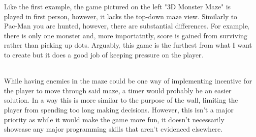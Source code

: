 \documentclass{article}
\begin{document}
\begin{minipage}{0.5\textwidth}\raggedright
Like the first example, the game pictured on the left "3D Monster Maze" is played in first person, however, it lacks the top-down maze view. Similarly to Pac-Man you are hunted, however, there are substantial differences. For example, there is only one monster and, more importatntly, score is gained from surviving rather than picking up dots. Arguably, this game is the furthest from what I want to create but it does a good job of keeping pressure on the player.
\end{minipage}
\linebreak
\\
\linebreak
While having enemies in the maze could be one way of implementing incentive for the player to move through said maze, a timer would probably be an easier solution. In a way this is more similar to the purpose of the wall, limiting the player from spending too long making decisions. However, this isn't a major priority as while it would make the game more fun, it doesn't necessarily showcase any major programming skills that aren't evidenced elsewhere.
\clearpage
\end{document}
